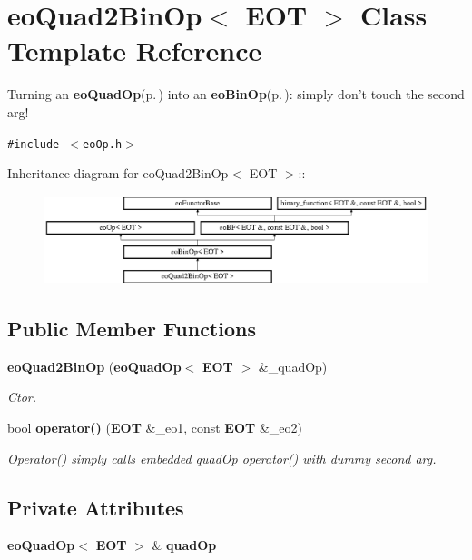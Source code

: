 \section{eo\-Quad2Bin\-Op$<$ EOT $>$ Class Template Reference}
\label{classeo_quad2_bin_op}
Turning an {\bf eo\-Quad\-Op}{\rm (p.\,\pageref{classeo_quad_op})} into an {\bf eo\-Bin\-Op}{\rm (p.\,\pageref{classeo_bin_op})}: simply don't touch the second arg!  


{\tt \#include $<$eo\-Op.h$>$}

Inheritance diagram for eo\-Quad2Bin\-Op$<$ EOT $>$::\begin{figure}[H]
\begin{center}
\leavevmode
\includegraphics[height=2.60163cm]{classeo_quad2_bin_op}
\end{center}
\end{figure}
\subsection*{Public Member Functions}
\begin{CompactItemize}
\item 
{\bf eo\-Quad2Bin\-Op} ({\bf eo\-Quad\-Op}$<$ {\bf EOT} $>$ \&\_\-quad\-Op)
\begin{CompactList}\small\item\em Ctor. \item\end{CompactList}\item 
bool {\bf operator()} ({\bf EOT} \&\_\-eo1, const {\bf EOT} \&\_\-eo2)\label{classeo_quad2_bin_op_a1}

\begin{CompactList}\small\item\em Operator() simply calls embedded quad\-Op operator() with dummy second arg. \item\end{CompactList}\end{CompactItemize}
\subsection*{Private Attributes}
\begin{CompactItemize}
\item 
{\bf eo\-Quad\-Op}$<$ {\bf EOT} $>$ \& {\bf quad\-Op}\label{classeo_quad2_bin_op_r0}

\end{CompactItemize}


